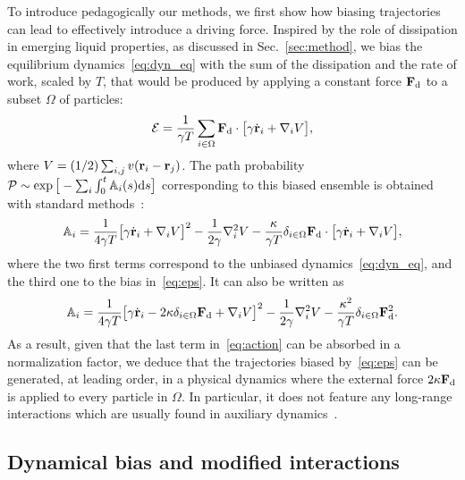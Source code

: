 \documentclass[superscriptaddress, twocolumn, prx, longbibliography, nofootinbib]{revtex4-1}
\begin{document}
To introduce pedagogically our methods, we first show how biasing trajectories can lead to effectively introduce a driving force. Inspired by the role of dissipation in emerging liquid properties, as discussed in Sec.~\ref{sec:method}, we bias the equilibrium dynamics~\eqref{eq:dyn_eq} with the sum of the dissipation and the rate of work, scaled by $T$, that would be produced by applying a constant force ${\bf F}_{\rm d}$ to a subset $\Omega$ of particles:
\begin{equation}\label{eq:eps}
	{\cal E} = \frac{1}{\gamma T}\sum_{i\in\Omega} {\bf F}_{\rm d}\cdot\big[ \gamma\dot{\bf r}_i + \nabla_i V \big] ,
\end{equation}
where $V=(1/2)\sum_{i,j}v({\bf r}_i-{\bf r}_j)$. The path probability ${\cal P}\sim\exp\big[-\sum_i\int_0^t{\mathbb A}_i(s){\rm d}s\big]$ corresponding to this biased ensemble is obtained with standard methods~\cite{Martin1973, Dominicis1975}:
\begin{equation}\label{eq:action_exp}
	{\mathbb A}_i = \frac{1}{4\gamma T} \big[\gamma\dot{\bf r}_i + \nabla_iV\big]^2 - \frac{1}{2\gamma} \nabla^2_iV - \frac{\kappa}{\gamma T} \delta_{i\in\Omega} {\bf F}_{\rm d} \cdot\big[ \gamma\dot{\bf r}_i + \nabla_i V \big] ,
\end{equation}
where the two first terms correspond to the unbiased dynamics~\eqref{eq:dyn_eq}, and the third one to the bias in~\eqref{eq:eps}. It can also be written as
\begin{equation}\label{eq:action}
	{\mathbb A}_i = \frac{1}{4\gamma T} \big[\gamma\dot{\bf r}_i - 2\kappa\delta_{i\in\Omega}{\bf F}_{\rm d} + \nabla_iV\big]^2 - \frac{1}{2\gamma} \nabla^2_iV - \frac{\kappa^2}{\gamma T}\delta_{i\in\Omega}{\bf F}_{\rm d}^2 .
\end{equation}
As a result, given that the last term in~\eqref{eq:action} can be absorbed in a normalization factor, we deduce that the trajectories biased by~\eqref{eq:eps} can be generated, at leading order, in a physical dynamics where the external force $2\kappa{\bf F}_{\rm d}$ is applied to every particle in $\Omega$. In particular, it does not feature any long-range interactions which are usually found in auxiliary dynamics~\cite{Jack2015}.




\subsection{Dynamical bias and modified interactions}
\end{document}

